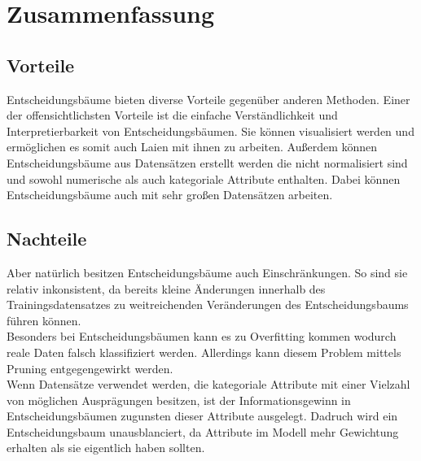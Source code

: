 \chapter{Zusammenfassung}
\label{zusammenfassung}

\section{Vorteile}
\label{vorteile}
Entscheidungsbäume bieten diverse Vorteile gegenüber anderen Methoden. Einer der offensichtlichsten Vorteile ist die einfache Verständlichkeit und Interpretierbarkeit von Entscheidungsbäumen. \autocite{DataMining} Sie können visualisiert werden und ermöglichen es somit auch Laien mit ihnen zu arbeiten. \autocite{PythonCourseDecisionTrees:online} Außerdem können Entscheidungsbäume aus Datensätzen erstellt werden die nicht normalisiert sind und sowohl numerische als auch kategoriale Attribute enthalten. Dabei können Entscheidungsbäume auch mit sehr großen Datensätzen arbeiten. \autocite{PythonCourseDecisionTrees:online}\\

\section{Nachteile}
\label{nachteile}
Aber natürlich besitzen Entscheidungsbäume auch Einschränkungen. So sind sie relativ inkonsistent, da bereits kleine Änderungen innerhalb des Trainingsdatensatzes zu weitreichenden Veränderungen des Entscheidungsbaums führen können. \autocite{PythonCourseDecisionTrees:online}\\
Besonders bei Entscheidungsbäumen kann es zu Overfitting kommen wodurch reale Daten falsch klassifiziert werden. Allerdings kann diesem Problem mittels Pruning entgegengewirkt werden. \autocite{DataMining}\\
Wenn Datensätze verwendet werden, die kategoriale Attribute mit einer Vielzahl von möglichen Ausprägungen besitzen, ist der Informationsgewinn in Entscheidungsbäumen zugunsten dieser Attribute ausgelegt. \autocite{PythonCourseDecisionTrees:online} Dadruch wird ein Entscheidungsbaum unausblanciert, da Attribute im Modell mehr Gewichtung erhalten als sie eigentlich haben sollten. 